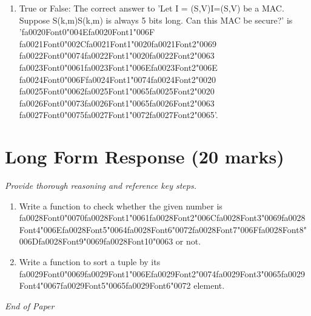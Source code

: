 \documentclass[12pt]{article}
\begin{document}
\begin{enumerate}[label=\arabic*.]
\item True or False: The correct answer to 'Let I = (S,V)I=(S,V) be a MAC. Suppose S(k,m)S(k,m) is always 5 bits long. Can this MAC be secure?' is '{\csname fa0020Font0\endcsname\char"004E}{\csname fa0020Font1\endcsname\char"006F} {\csname fa0021Font0\endcsname\char"002C}{\csname fa0021Font1\endcsname\char"0020}{\csname fa0021Font2\endcsname\char"0069} {\csname fa0022Font0\endcsname\char"0074}{\csname fa0022Font1\endcsname\char"0020}{\csname fa0022Font2\endcsname\char"0063} {\csname fa0023Font0\endcsname\char"0061}{\csname fa0023Font1\endcsname\char"006E}{\csname fa0023Font2\endcsname\char"006E} {\csname fa0024Font0\endcsname\char"006F}{\csname fa0024Font1\endcsname\char"0074}{\csname fa0024Font2\endcsname\char"0020} {\csname fa0025Font0\endcsname\char"0062}{\csname fa0025Font1\endcsname\char"0065}{\csname fa0025Font2\endcsname\char"0020} {\csname fa0026Font0\endcsname\char"0073}{\csname fa0026Font1\endcsname\char"0065}{\csname fa0026Font2\endcsname\char"0063} {\csname fa0027Font0\endcsname\char"0075}{\csname fa0027Font1\endcsname\char"0072}{\csname fa0027Font2\endcsname\char"0065}'.
\end{enumerate}

\section*{Long Form Response (20 marks)}
\textit{Provide thorough reasoning and reference key steps.}
\begin{enumerate}[label=\arabic*.]
\item Write a function to check whether the given number is {\csname fa0028Font0\endcsname\char"0070}{\csname fa0028Font1\endcsname\char"0061}{\csname fa0028Font2\endcsname\char"006C}{\csname fa0028Font3\endcsname\char"0069}{\csname fa0028Font4\endcsname\char"006E}{\csname fa0028Font5\endcsname\char"0064}{\csname fa0028Font6\endcsname\char"0072}{\csname fa0028Font7\endcsname\char"006F}{\csname fa0028Font8\endcsname\char"006D}{\csname fa0028Font9\endcsname\char"0069}{\csname fa0028Font10\endcsname\char"0063} or not.
\item Write a function to sort a tuple by its {\csname fa0029Font0\endcsname\char"0069}{\csname fa0029Font1\endcsname\char"006E}{\csname fa0029Font2\endcsname\char"0074}{\csname fa0029Font3\endcsname\char"0065}{\csname fa0029Font4\endcsname\char"0067}{\csname fa0029Font5\endcsname\char"0065}{\csname fa0029Font6\endcsname\char"0072} element.
\end{enumerate}

\vfill
\noindent\textit{End of Paper}
\end{document}
